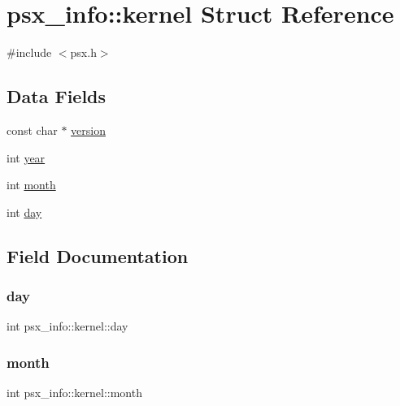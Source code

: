 \hypertarget{structpsx__info_1_1kernel}{}\section{psx\+\_\+info\+:\+:kernel Struct Reference}
\label{structpsx__info_1_1kernel}


{\ttfamily \#include $<$psx.\+h$>$}

\subsection*{Data Fields}
\begin{DoxyCompactItemize}
\item 
const char $\ast$ \hyperlink{structpsx__info_1_1kernel_adf920bd7e3545f508697900f6da60940}{version}
\item 
int \hyperlink{structpsx__info_1_1kernel_a347d5fa74908bbc54b31530a0a3e3416}{year}
\item 
int \hyperlink{structpsx__info_1_1kernel_a82f74ec63c15c58bbd6f3a7b3efd3d68}{month}
\item 
int \hyperlink{structpsx__info_1_1kernel_a7fbcf81b0b1cbb011bb3fcb4e7869723}{day}
\end{DoxyCompactItemize}


\subsection{Field Documentation}
\mbox{\label{structpsx__info_1_1kernel_a7fbcf81b0b1cbb011bb3fcb4e7869723}} 
\subsubsection{\texorpdfstring{day}{day}}
{\footnotesize\ttfamily int psx\+\_\+info\+::kernel\+::day}

\mbox{\label{structpsx__info_1_1kernel_a82f74ec63c15c58bbd6f3a7b3efd3d68}} 
\subsubsection{\texorpdfstring{month}{month}}
{\footnotesize\ttfamily int psx\+\_\+info\+::kernel\+::month}

